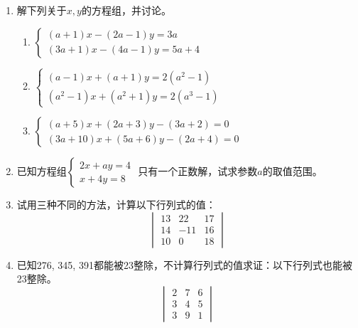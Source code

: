 \begin{enumerate}
\item 解下列关于$x,y$的方程组，并讨论。
\begin{enumerate}
    \item $\begin{cases}
        (a+1)x-(2a-1)y=3a\\(3a+1)x-(4a-1)y=5a+4
    \end{cases}$
    \item $\begin{cases}
        (a-1)x+(a+1)y=2(a^2-1)\\(a^2-1)x+(a^2+1)y=2(a^3-1)
    \end{cases}$
    \item $\begin{cases}
        (a+5)x+(2a+3)y-(3a+2)=0\\(3a+10)x+(5a+6)y-(2a+4)=0
    \end{cases}$
\end{enumerate}

\item 已知方程组$\begin{cases}
    2x+ay=4\\x+4y=8
\end{cases}$
只有一个正数解，试求参数$a$的取值范围。

\item 试用三种不同的方法，计算以下行列式的值：
\[\begin{vmatrix}
    13&22&17\\14&-11&16\\10&0&18
\end{vmatrix}\]

\item 已知276, 345, 391都能被23整除，不计算行列式的值求证：以下行列式也能被23整除。
\[\begin{vmatrix}
    2&7&6\\3&4&5\\3&9&1
\end{vmatrix}\]


\end{enumerate}
